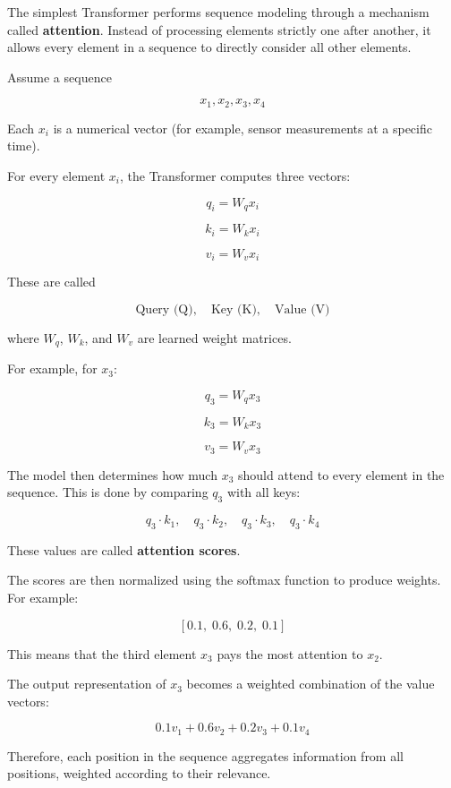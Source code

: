 \documentclass{book}
\begin{document}
The simplest Transformer performs sequence modeling through a mechanism called \textbf{attention}. Instead of processing elements strictly one after another, it allows every element in a sequence to directly consider all other elements.

    Assume a sequence
    
    \[
    x_1, x_2, x_3, x_4
    \]
    
    Each \(x_i\) is a numerical vector (for example, sensor measurements at a specific time).
    
    For every element \(x_i\), the Transformer computes three vectors:
    
    \[
    q_i = W_q x_i
    \]
    
    \[
    k_i = W_k x_i
    \]
    
    \[
    v_i = W_v x_i
    \]
    
    These are called
    
    \[
    \text{Query (Q)}, \quad \text{Key (K)}, \quad \text{Value (V)}
    \]
    
    where \(W_q\), \(W_k\), and \(W_v\) are learned weight matrices.
    
    For example, for \(x_3\):
    
    \[
    q_3 = W_q x_3
    \]
    
    \[
    k_3 = W_k x_3
    \]
    
    \[
    v_3 = W_v x_3
    \]
    
    The model then determines how much \(x_3\) should attend to every element in the sequence. This is done by comparing \(q_3\) with all keys:
    
    \[
    q_3 \cdot k_1,\quad q_3 \cdot k_2,\quad q_3 \cdot k_3,\quad q_3 \cdot k_4
    \]
    
    These values are called \textbf{attention scores}.
    
    The scores are then normalized using the softmax function to produce weights. For example:
    
    \[
    [0.1,\; 0.6,\; 0.2,\; 0.1]
    \]
    
    This means that the third element \(x_3\) pays the most attention to \(x_2\).
    
    The output representation of \(x_3\) becomes a weighted combination of the value vectors:
    
    \[
    0.1 v_1 + 0.6 v_2 + 0.2 v_3 + 0.1 v_4
    \]
    
    Therefore, each position in the sequence aggregates information from all positions, weighted according to their relevance.
    
\end{document}
